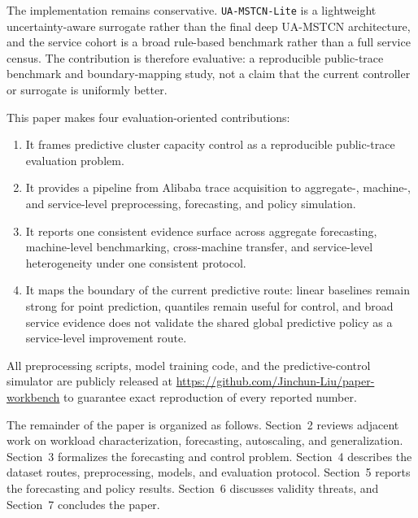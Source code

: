 The implementation remains conservative. \texttt{UA-MSTCN-Lite} is a lightweight uncertainty-aware surrogate rather than the final deep UA-MSTCN architecture, and the service cohort is a broad rule-based benchmark rather than a full service census. The contribution is therefore evaluative: a reproducible public-trace benchmark and boundary-mapping study, not a claim that the current controller or surrogate is uniformly better.

This paper makes four evaluation-oriented contributions:
\begin{enumerate}
  \item It frames predictive cluster capacity control as a reproducible public-trace evaluation problem.
  \item It provides a pipeline from Alibaba trace acquisition to aggregate-, machine-, and service-level preprocessing, forecasting, and policy simulation.
  \item It reports one consistent evidence surface across aggregate forecasting, machine-level benchmarking, cross-machine transfer, and service-level heterogeneity under one consistent protocol.
  \item It maps the boundary of the current predictive route: linear baselines remain strong for point prediction, quantiles remain useful for control, and broad service evidence does not validate the shared global predictive policy as a service-level improvement route.
\end{enumerate}

All preprocessing scripts, model training code, and the predictive-control simulator are publicly released at \url{https://github.com/Jinchun-Liu/paper-workbench} to guarantee exact reproduction of every reported number.

The remainder of the paper is organized as follows. Section~2 reviews adjacent work on workload characterization, forecasting, autoscaling, and generalization. Section~3 formalizes the forecasting and control problem. Section~4 describes the dataset routes, preprocessing, models, and evaluation protocol. Section~5 reports the forecasting and policy results. Section~6 discusses validity threats, and Section~7 concludes the paper.
